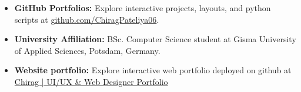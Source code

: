 \documentclass[10pt,a4paper]{article}
\newlength{\MW}\setlength{\MW}{14.7cm}   %
\begin{document}
\begin{minipage}[t]{\MW}
\begin{minipage}[t]{\MW-26pt}
    \begin{itemize}[leftmargin=1.2em,itemsep=2.5pt,topsep=2.5pt]
      \footnotesize
      \item {\bfseries\color{Midnight}GitHub Portfolios:}
            {\color{Muted} Explore interactive projects, layouts, and python scripts at \href{https://github.com/ChiragPateliya06}{github.com/ChiragPateliya06}.}
      \item {\bfseries\color{Midnight}University Affiliation:}
            {\color{Muted} BSc. Computer Science student at Gisma University of Applied Sciences, Potsdam, Germany.}
            \item {\bfseries\color{Midnight}Website portfolio:}
            {\color{Muted} Explore interactive web portfolio deployed on github at \href{https://chirag006git.github.io/Personal-Portfolio/website/}{Chirag | UI/UX \& Web Designer Portfolio}  }
    \end{itemize}
  \end{minipage}
\end{minipage}
\end{document}
